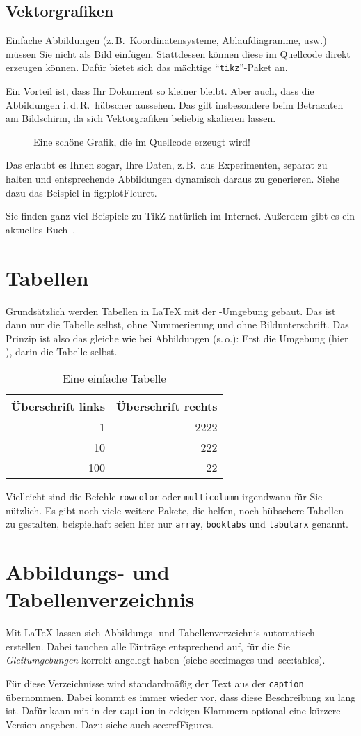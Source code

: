\subsection{Vektorgrafiken}
\label{sec:vectorGraphcis}
%
Einfache Abbildungen (z.\,B.\ Koordinatensysteme, Ablaufdiagramme, usw.) müssen Sie nicht als Bild einfügen. Stattdessen können diese im Quellcode direkt erzeugen können. Dafür bietet sich das mächtige \enquote{\texttt{tikz}}-Paket an.
\par
Ein Vorteil ist, dass Ihr Dokument so kleiner bleibt. Aber auch, dass die Abbildungen i.\,d.\,R.\ hübscher aussehen. Das gilt insbesondere beim Betrachten am Bildschirm, da sich Vektorgrafiken beliebig skalieren lassen.
%
\begin{figure}[tbh]
\centering

\caption{Eine schöne Grafik, die im Quellcode erzeugt wird!}
\label{fig:plotFleuret}
\end{figure}
%
Das erlaubt es Ihnen sogar, Ihre Daten, z.\,B.\ aus Experimenten, separat zu halten und entsprechende Abbildungen dynamisch daraus zu generieren. Siehe dazu das Beispiel in fig:plotFleuret.
\par
Sie finden ganz viel Beispiele zu TikZ natürlich im Internet. Außerdem gibt es ein aktuelles Buch~\cite{kottwitz:tikz}.
%
%
\section{Tabellen}
\label{sec:tables}
Grundsätzlich werden Tabellen in \LaTeX{} mit der -Umgebung gebaut. Das ist dann nur die Tabelle selbst, ohne Nummerierung und ohne Bildunterschrift. Das Prinzip ist also das gleiche wie bei Abbildungen (s.\,o.): Erst die Umgebung (hier ), darin die Tabelle selbst.
%
\begin{table}[tbh]
 \centering
 \begin{tabular}{r|r}
 Überschrift links & Überschrift rechts\\
 \hline
 1   & 2222\\
 10  & 222\\
 100 & 22
 \end{tabular}
 \caption{Eine einfache Tabelle}
 \label{tab:example}
\end{table}
%
Vielleicht sind die Befehle \texttt{rowcolor} oder \texttt{multicolumn} irgendwann für Sie nützlich. Es gibt noch viele weitere Pakete, die helfen, noch hübschere Tabellen zu gestalten, beispielhaft seien hier nur \texttt{array}, \texttt{booktabs} und \texttt{tabularx} genannt.
%
%
\section{Abbildungs- und Tabellenverzeichnis}
\label{sec:captions}
Mit \LaTeX{} lassen sich Abbildungs- und Tabellenverzeichnis automatisch erstellen. Dabei tauchen alle Einträge entsprechend auf, für die Sie \emph{Gleitumgebungen} korrekt angelegt haben (siehe sec:images und~sec:tables).
\par
Für diese Verzeichnisse wird standardmäßig der Text aus der \texttt{caption} übernommen. Dabei kommt es immer wieder vor, dass diese Beschreibung zu lang ist. Dafür kann mit in der \texttt{caption} in eckigen Klammern optional eine kürzere Version angeben. Dazu siehe auch sec:refFigures.
%
%
